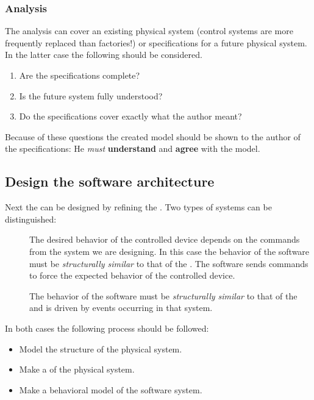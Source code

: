 \subsubsection{Analysis}
The analysis can cover an existing physical system (control systems are more frequently replaced than factories!) or specifications for a future physical system.
In the latter case the following should be considered.
\begin{enumerate}
	\item Are the specifications complete?
	\item Is the future system fully understood?
	\item Do the specifications cover exactly what the author meant?  
\end{enumerate}
Because of these questions the created model should be shown to the author of the specifications: 
He \textit{must} \textbf{understand} and \textbf{agree} with the model.




\subsection{Design the software architecture}
\label{sss:design}
Next the  can be designed by refining the . 
Two types of systems can be distinguished:
\begin{description}
	\item[] The desired behavior of the controlled device depends on the commands from the system we are designing.
		In this case the behavior of the software must be \emph{structurally similar} to that of the .
		The software sends commands to force the expected behavior of the controlled device.
	\item[] The behavior of the software must be \emph{structurally similar} to that of the  and is driven by events occurring in that system.
\end{description}

In both cases the following process should be followed:
\begin{itemize}
	\item Model the structure of the physical system. 
	\item Make a  of the physical system.
	\item Make a behavioral model of the software system.
\end{itemize}

